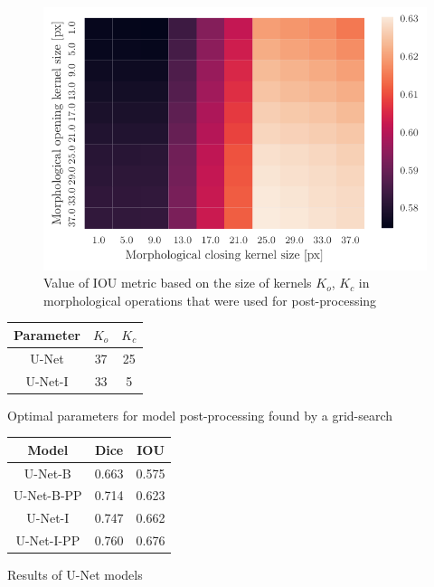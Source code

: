\begin{figure}[H]
    \centering
    \includegraphics[]{images/heatmap_of_unetpostproc_search.pdf}
    \caption{Value of IOU metric based on the size of kernels $K_o$, $K_c$ in morphological operations that were used for post-processing}
    \label{fig:heatmap_postprocess}
\end{figure}

\begin{minipage}{\textwidth}

    \begin{minipage}[t]{0.48\textwidth}
        \centering
        \makeatletter{}
        \begin{tabular}{|c|c|c|}
            \hline
            Parameter & $K_o$ & $K_c$ \\ \hline
            U-Net     & 37    & 25    \\ \hline
            U-Net-I   & 33    & 5     \\ \hline
        \end{tabular}
        \caption{Optimal parameters for model post-processing found by a grid-search}
        \label{tab:unet_seg_hyperparams}
    \end{minipage}
    \begin{minipage}[t]{0.48\textwidth}
        \centering
        \makeatletter{}
        \begin{tabular}{|c|c|c|}
            \hline
            Model      & Dice  & IOU   \\ \hline
            U-Net-B    & 0.663 & 0.575 \\ \hline
            U-Net-B-PP & 0.714 & 0.623 \\ \hline
            U-Net-I    & 0.747 & 0.662 \\ \hline
            U-Net-I-PP & 0.760 & 0.676 \\ \hline
        \end{tabular}
        \caption{Results of U-Net models}
        \label{tab:unet_seg_results}
    \end{minipage}
\end{minipage}


